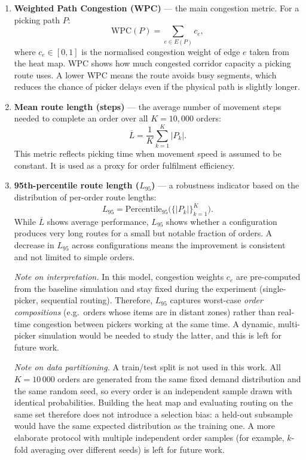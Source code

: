 \documentclass[12pt,a4paper]{article}
\begin{document}
\begin{enumerate}
  \item \textbf{Weighted Path Congestion (WPC)} --- the main congestion metric.
    For a picking path $P$:
    \[
      \mathrm{WPC}(P) = \sum_{e \in E(P)} c_e,
    \]
    where $c_e \in [0,1]$ is the normalised congestion weight of edge $e$ taken
    from the heat map. WPC shows how much congested corridor capacity a picking
    route uses. A lower WPC means the route avoids busy segments, which reduces
    the chance of picker delays even if the physical path is slightly longer.

  \item \textbf{Mean route length (steps)} --- the average number of movement steps
    needed to complete an order over all $K = 10{,}000$ orders:
    \[
      \overline{L} = \frac{1}{K} \sum_{k=1}^{K} |P_k|.
    \]
    This metric reflects picking time when movement speed is assumed to be constant.
    It is used as a proxy for order fulfilment efficiency.

  \item \textbf{95th-percentile route length ($L_{95}$)} --- a robustness indicator
    based on the distribution of per-order route lengths:
    \[
      L_{95} = \mathrm{Percentile}_{95}\bigl(\{|P_k|\}_{k=1}^{K}\bigr).
    \]
    While $\overline{L}$ shows average performance, $L_{95}$ shows whether a
    configuration produces very long routes for a small but notable fraction of orders.
    A decrease in $L_{95}$ across configurations means the improvement is consistent
    and not limited to simple orders.

    \textit{Note on interpretation.} In this model, congestion weights $c_e$ are
    pre-computed from the baseline simulation and stay fixed during the experiment
    (single-picker, sequential routing). Therefore, $L_{95}$ captures worst-case
    \emph{order compositions} (e.g.\ orders whose items are in distant zones) rather
    than real-time congestion between pickers working at the same time. A dynamic,
    multi-picker simulation would be needed to study the latter, and this is left
    for future work.

    \textit{Note on data partitioning.} A train/test split is not used in this
    work. All $K = 10\,000$ orders are generated from the same fixed demand
    distribution and the same random seed, so every order is an independent sample
    drawn with identical probabilities. Building the heat map and evaluating
    routing on the same set therefore does not introduce a selection bias:
    a held-out subsample would have the same expected distribution as the training
    one. A more elaborate protocol with multiple independent order samples (for
    example, $k$-fold averaging over different seeds) is left for future work.
\end{enumerate}
\end{document}
